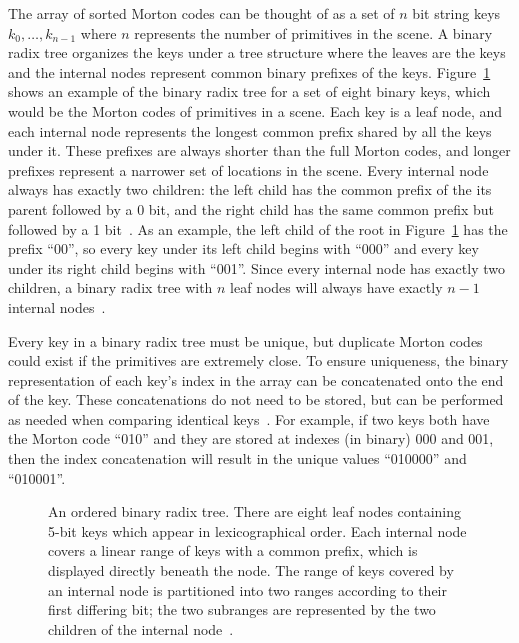 \documentclass{sig-alternate}
\begin{document}
The array of sorted Morton codes can be thought of as a set of $n$ bit string keys \begin{math}k_{0},\dots,k_{n-1}\end{math} where $n$ represents the number of primitives in the scene. A binary radix tree organizes the keys under a tree structure where the leaves are the keys and the internal nodes represent common binary prefixes of the keys. Figure~\ref{fig:BinaryRadixTree} shows an example of the binary radix tree for a set of eight binary keys, which would be the Morton codes of primitives in a scene. Each key is a leaf node, and each internal node represents the longest common prefix shared by all the keys under it. These prefixes are always shorter than the full Morton codes, and longer prefixes represent a narrower set of locations in the scene. Every internal node always has exactly two children: the left child has the common prefix of the its parent followed by a 0 bit, and the right child has the same common prefix but followed by a 1 bit~\cite{Karras:2012}. As an example, the left child of the root in Figure~\ref{fig:BinaryRadixTree} has the prefix ``00'', so every key under its left child begins with ``000'' and every key under its right child begins with ``001''. Since every internal node has exactly two children, a binary radix tree with $n$ leaf nodes will always have exactly $n-1$ internal nodes~\cite{Wald:2007}.

Every key in a binary radix tree must be unique, but duplicate Morton codes could exist if the primitives are extremely close. To ensure uniqueness, the binary representation of each key's index in the array can be concatenated onto the end of the key. These concatenations do not need to be stored, but can be performed as needed when comparing identical keys~\cite{Karras:2012}. For example, if two keys both have the Morton code ``010'' and they are stored at indexes (in binary) 000 and 001, then the index concatenation will result in the unique values ``010000'' and ``010001''. 

\begin{figure}
\centering
{}
\caption{An ordered binary radix tree. There are eight leaf nodes containing 5-bit keys which appear in lexicographical order. Each internal node covers a linear range of keys with a common prefix, which is displayed directly beneath the node. The range of keys covered by an internal node is partitioned into two ranges according to their first differing bit; the two subranges are represented by the two children of the internal node~\cite{Karras:2012}.}
\label{fig:BinaryRadixTree}
\end{figure}
\end{document}
